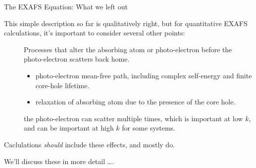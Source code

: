 \begin{slide}{The EXAFS Equation: What we left out}

    \vmm

    This simple description so far is qualitatively right, but for quantitative
    EXAFS calculations, it's important to consider several other points:

    \vspace{2mm}

    \begin{minipage}{102mm}
    \begin{description}
    \item[]  Processes that alter the absorbing
      atom or photo-electron before the photo-electron scatters back home.
      \begin{itemize}
      \item[\BlueEmph{Extrinsic Losses}] photo-electron mean-free path,
        including complex self-energy and finite core-hole lifetime.
      \item[\BlueEmph{Intrinsic Losses}] relaxation of absorbing atom due to
        the  presence of the core hole.
      \end{itemize}

    \item[] the photo-electron can scatter
      multiple times, which is important at low $k$, and can be important
      at high $k$ for some systems.

    \end{description}
    \end{minipage}

    \pause


    \vspace{3mm}
    Caclulations {\emph{should}} include these effects, and mostly do.


    \vspace{3mm}
    We'll discuss these in more detail \ldots.
\vfill

\vfill
\end{slide}

